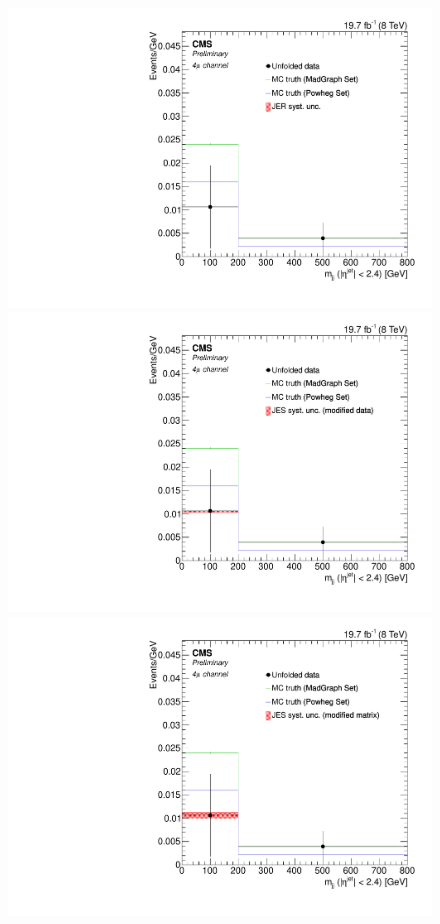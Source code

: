 \begin{figure}[hbtp]
\begin{center}
    \includegraphics[width=0.8\cmsFigWidth]{Figures/Unfolding/Systematics/ZZTo4m_CentralMjj_JER_Mad_fr}
    \includegraphics[width=0.8\cmsFigWidth]{Figures/Unfolding/Systematics/ZZTo4m_CentralMjj_JES_ModData_Mad_fr}     
    \includegraphics[width=0.8\cmsFigWidth]{Figures/Unfolding/Systematics/ZZTo4m_CentralMjj_JES_ModMat_Mad_fr}

\end{center}
\end{figure}
